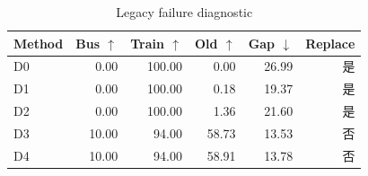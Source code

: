 \begin{table}[htbp]
\centering
\caption{Legacy failure diagnostic}
\label{tab:diagnostic}
\begin{tabular}{lrrrrr}
\toprule
Method & Bus $\uparrow$ & Train $\uparrow$ & Old $\uparrow$ & Gap $\downarrow$ & Replace \\ 
\midrule
D0 & 0.00 & 100.00 & 0.00 & 26.99 & 是 \\
D1 & 0.00 & 100.00 & 0.18 & 19.37 & 是 \\
D2 & 0.00 & 100.00 & 1.36 & 21.60 & 是 \\
D3 & 10.00 & 94.00 & 58.73 & 13.53 & 否 \\
D4 & 10.00 & 94.00 & 58.91 & 13.78 & 否 \\
\bottomrule
\end{tabular}
\end{table}
